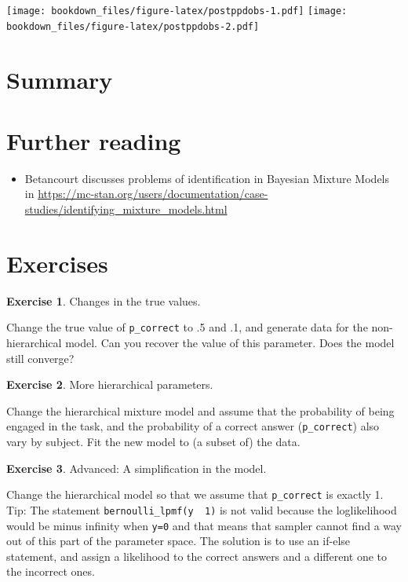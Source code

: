 \documentclass[12pt,]{krantz}
\providecommand{\tightlist}{%
  \setlength{\itemsep}{0pt}\setlength{\parskip}{0pt}}
\theoremstyle{definition}
\theoremstyle{definition}
\theoremstyle{definition}
\newtheorem{exercise}{Exercise}[chapter]
\theoremstyle{remark}
\begin{document}
\texttt{[image: bookdown\_files/figure-latex/postppdobs-1.pdf]} \texttt{[image: bookdown\_files/figure-latex/postppdobs-2.pdf]}

\hypertarget{summary-8}{%
\section{Summary}\label{summary-8}}

\hypertarget{further-reading-12}{%
\section{Further reading}\label{further-reading-12}}

\begin{itemize}
\tightlist
\item
  Betancourt discusses problems of identification in Bayesian Mixture Models in \url{https://mc-stan.org/users/documentation/case-studies/identifying_mixture_models.html}
\end{itemize}

\hypertarget{exercises-10}{%
\section{Exercises}\label{exercises-10}}

\begin{exercise}
\protect\hypertarget{exr:pcorrect}{}{\label{exr:pcorrect} }Changes in the true values.
\end{exercise}

Change the true value of \texttt{p\_correct} to .5 and .1, and generate data for the non-hierarchical model. Can you recover the value of this parameter. Does the model still converge?

\begin{exercise}
\protect\hypertarget{exr:mixhier}{}{\label{exr:mixhier} }More hierarchical parameters.
\end{exercise}

Change the hierarchical mixture model and assume that the probability of being engaged in the task, and the probability of a correct answer (\texttt{p\_correct}) also vary by subject. Fit the new model to (a subset of) the data.

\begin{exercise}
\protect\hypertarget{exr:simp}{}{\label{exr:simp} }Advanced: A simplification in the model.
\end{exercise}

Change the hierarchical model so that we assume that \texttt{p\_correct} is exactly 1. Tip: The statement \texttt{bernoulli\_lpmf(y\ \textbar{}\ 1)} is not valid because the loglikelihood would be minus infinity when \texttt{y=0} and that means that sampler cannot find a way out of this part of the parameter space. The solution is to use an if-else statement, and assign a likelihood to the correct answers and a different one to the incorrect ones.
\end{document}
